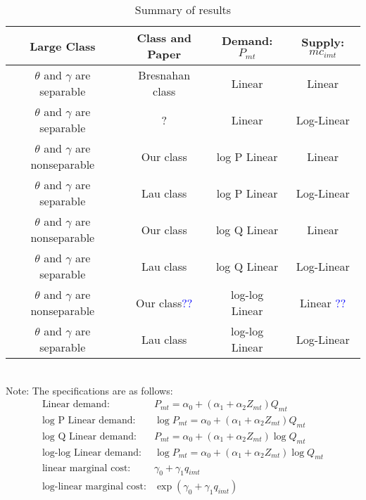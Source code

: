 \documentclass[11pt]{article}
\begin{document}
\begin{table}[!ht]
\caption{Summary of results}
\centering
\scriptsize
\begin{tabular}{c|c|c|c} 
 \hline
 Large Class & Class and Paper & Demand: $P_{mt}$ &  Supply: $mc_{imt}$ \\ 
 \hline
 $\theta$ and $\gamma$ are separable &Bresnahan class \citep{merel2009measuring}& Linear  &  Linear \\ 
 $\theta$ and $\gamma$ are separable&? \citep{perloff2012collinearity} & Linear  &  Log-Linear \\  
 $\theta$ and $\gamma$ are nonseparable&Our class \citep{perloff2012collinearity}& log P Linear  &  Linear \\ 
 $\theta$ and $\gamma$ are separable &Lau class \citep{perloff2012collinearity}& log P Linear  &  Log-Linear \\ 
 $\theta$ and $\gamma$ are nonseparable&Our class \citep{perloff2012collinearity}& log Q Linear  &  Linear \\ 
 $\theta$ and $\gamma$ are separable&Lau class \citep{coccorese2013multimarket}& log Q Linear  &  Log-Linear\\ 
 $\theta$ and $\gamma$ are nonseparable&Our class\citep{okazaki2022excess,merel2009measuring}\textcolor{blue}{??}& log-log Linear  &  Linear  \textcolor{blue}{??} \\ 
  $\theta$ and $\gamma$ are separable&Lau class \citep{hyde1995can}& log-log Linear  &  Log-Linear\\ 
 \hline
\end{tabular}
\label{tb:summary_of_results}
\\
\footnotesize Note: The specifications are as follows:
\begin{align*}
    \text{Linear demand:}& P_{mt}=\alpha_0+(\alpha_1+\alpha_2 Z_{mt}) Q_{mt}\\
    \text{log P Linear demand:}&
    \log P_{mt}=\alpha_0+(\alpha_1+\alpha_2 Z_{mt}) Q_{mt}\\
    \text{log Q Linear demand:}&    P_{mt}=\alpha_0+(\alpha_1+\alpha_2 Z_{mt}) \log Q_{mt}\\
    \text{log-log Linear demand:}&
    \log P_{mt}=\alpha_0+(\alpha_1+\alpha_2 Z_{mt})\log Q_{mt}\\
    \text{linear marginal cost}:&
    \gamma_0+\gamma_1 q_{imt}\\
    \text{log-linear marginal cost}:&
    \exp(\gamma_0+\gamma_1 q_{imt})
\end{align*}
\end{table}
\end{document}
